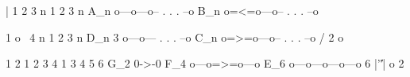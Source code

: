 %
%
%
%
%
%
|         1   2   3           n                1   2   3           n
   A_n   o---o---o-- . . . --o          B_n   o=<=o---o-- . . . --o

       1 o
          \    4             n                1   2   3           n
   D_n   3 o---o---  . . . --o          C_n   o=>=o---o-- . . . --o
          /
       2 o

         1   2             1   2   3   4          1   3   4   5   6
   G_2   0->-0        F_4  o---o=>=o---o     E_6  o---o---o---o---o
           6                                              |'\|'|
                                                          o 2

